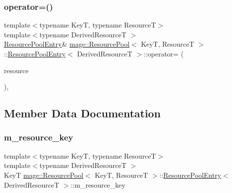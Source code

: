 \hypertarget{structmage_1_1_resource_pool_1_1_resource_pool_entry_ab9de5fdfecd8e19a510541b9353fe854}{}\label{structmage_1_1_resource_pool_1_1_resource_pool_entry_ab9de5fdfecd8e19a510541b9353fe854} 
\subsubsection{\texorpdfstring{operator=()}{operator=()}\hspace{0.1cm}{\footnotesize\ttfamily [2/2]}}
{\footnotesize\ttfamily template$<$typename KeyT, typename ResourceT$>$ \\
template$<$typename Derived\+ResourceT $>$ \\
\hyperlink{structmage_1_1_resource_pool_1_1_resource_pool_entry}{Resource\+Pool\+Entry}\& \hyperlink{classmage_1_1_resource_pool}{mage\+::\+Resource\+Pool}$<$ KeyT, ResourceT $>$\+::\hyperlink{structmage_1_1_resource_pool_1_1_resource_pool_entry}{Resource\+Pool\+Entry}$<$ Derived\+ResourceT $>$\+::operator= (\begin{DoxyParamCaption}\item[{\hyperlink{structmage_1_1_resource_pool_1_1_resource_pool_entry}{Resource\+Pool\+Entry}$<$ Derived\+ResourceT $>$ \&\&}]{resource }\end{DoxyParamCaption})\hspace{0.3cm}{\ttfamily [private]}, {\ttfamily [delete]}}



\subsection{Member Data Documentation}
\hypertarget{structmage_1_1_resource_pool_1_1_resource_pool_entry_a2ca0b2ee479f64dbec5288a9a8b2b4c9}{}\label{structmage_1_1_resource_pool_1_1_resource_pool_entry_a2ca0b2ee479f64dbec5288a9a8b2b4c9} 
\subsubsection{\texorpdfstring{m\+\_\+resource\+\_\+key}{m\_resource\_key}}
{\footnotesize\ttfamily template$<$typename KeyT, typename ResourceT$>$ \\
template$<$typename Derived\+ResourceT $>$ \\
KeyT \hyperlink{classmage_1_1_resource_pool}{mage\+::\+Resource\+Pool}$<$ KeyT, ResourceT $>$\+::\hyperlink{structmage_1_1_resource_pool_1_1_resource_pool_entry}{Resource\+Pool\+Entry}$<$ Derived\+ResourceT $>$\+::m\+\_\+resource\+\_\+key\hspace{0.3cm}{\ttfamily [private]}}

